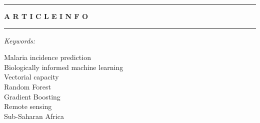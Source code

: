 \documentclass[10pt,twocolumn]{article}
\begin{document}
\vspace{0.6em}

\hrule

\vspace{0.7em}


\noindent
\begin{minipage}{0.25\textwidth}
\vspace{0pt}
\footnotesize

\textbf{A R T I C L E \quad I N F O}

\vspace{0.25em}
\hrule
\vspace{0.45em}

\textit{Keywords:}

\vspace{0.25em}

Malaria incidence prediction\\\vspace{2pt}
Biologically informed machine learning\\\vspace{2pt}
Vectorial capacity\\\vspace{2pt}
Random Forest\\\vspace{2pt}
Gradient Boosting\\\vspace{2pt}
Remote sensing\\\vspace{2pt}
Sub-Saharan Africa

\end{minipage}
\hfill
\end{document}
